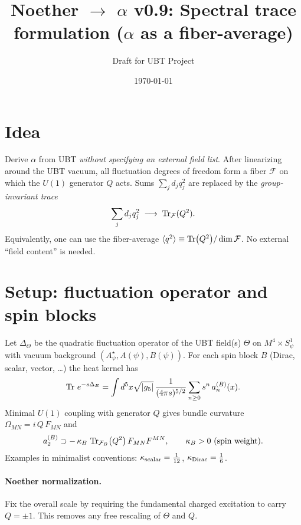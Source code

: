 \documentclass[12pt]{article}
\title{Noether $\to$ $\alpha$ v0.9: Spectral trace formulation (\texorpdfstring{$\alpha$}{alpha} as a fiber-average)}
\author{Draft for UBT Project}
\date{\today}
\begin{document}
\maketitle

\section*{Idea}
Derive $\alpha$ from UBT \emph{without specifying an external field list}. After linearizing around the UBT vacuum,
all fluctuation degrees of freedom form a fiber $\mathcal F$ on which the $U(1)$ generator $Q$ acts.
Sums $\sum_j d_j q_j^2$ are replaced by the \emph{group-invariant trace}
\begin{equation}
\sum_j d_j q_j^2 \;\longrightarrow\; \Tr_{\mathcal F}(Q^2).
\end{equation}
Equivalently, one can use the fiber-average $\langle q^2\rangle \equiv \Tr(Q^2)/\dim \mathcal F$. No external ``field content'' is needed.

\section{Setup: fluctuation operator and spin blocks}
Let $\Delta_\Theta$ be the quadratic fluctuation operator of the UBT field(s) $\Theta$ on $M^4\times S^1_\psi$ with vacuum background
$(A_\psi^\star, A(\psi),B(\psi))$. For each spin block $B$ (Dirac, scalar, vector, \ldots) the heat kernel has
\begin{equation}
\Tr \, e^{-s\Delta_B} = \int d^5x \sqrt{|g_5|}\,\frac{1}{(4\pi s)^{5/2}} \sum_{n\ge0} s^n\, a_n^{(B)}(x).
\end{equation}
Minimal $U(1)$ coupling with generator $Q$ gives bundle curvature $\Omega_{MN}=i\,Q\,F_{MN}$ and
\begin{equation}
a_2^{(B)} \supset -\,\kappa_B \,\Tr_{\mathcal F_B}\!\big(Q^2\big)\, F_{MN}F^{MN},
\qquad \kappa_B>0 \text{ (spin weight)}.
\end{equation}
Examples in minimalist conventions: $\kappa_{\rm scalar}=\tfrac{1}{12}$, $\kappa_{\rm Dirac}=\tfrac{1}{6}$.

\paragraph{Noether normalization.}
Fix the overall scale by requiring the fundamental charged excitation to carry $Q=\pm1$. This removes any free rescaling of $\Theta$ and $Q$.
\end{document}
